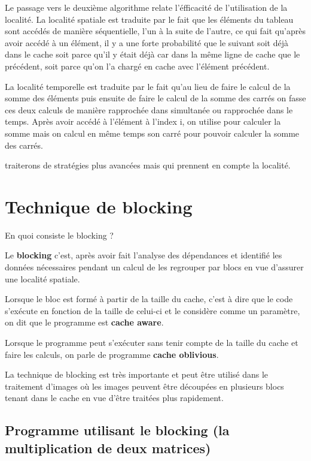 \documentclass[a4paper]{article}
\begin{document}
Le passage vers le deuxième algorithme relate l'éfficacité de l'utilisation de la localité. La localité spatiale est traduite par le fait que les éléments du tableau sont accédés de manière séquentielle, l'un à la suite de l'autre, ce qui fait qu'après avoir accédé à un élément, il y a une forte probabilité que le suivant soit déjà dans le cache soit parce qu'il y était déjà car dans la même ligne de cache que le précédent, soit parce qu'on l'a chargé en cache avec l'élément précédent.

La localité temporelle est traduite par le fait qu'au lieu de faire le calcul de la somme des éléments puis ensuite de faire le calcul de la somme des carrés on fasse ces deux calculs de manière rapprochée dans simultanée ou rapprochée dans le temps. Après avoir accédé à l'élément à l'index i, on utilise pour calculer la somme mais on calcul en même temps son carré pour pouvoir calculer la somme des carrés.


traiterons de stratégies plus avancées mais qui prennent en compte la localité.


\section{Technique de blocking}
\label{sec:org882f9c4}

En quoi consiste le blocking ?

Le \textbf{blocking} c'est, après avoir fait l'analyse des dépendances et identifié les données nécessaires pendant un calcul de les regrouper par blocs en vue d'assurer une localité spatiale.

Lorsque le bloc est formé à partir de la taille du cache, c'est à dire que le code s'exécute en fonction de la taille de celui-ci et le considère comme un paramètre, on dit que le programme est \textbf{cache aware}.

Lorsque le programme peut s'exécuter sans tenir compte de la taille du cache et faire les calculs, on parle de programme \textbf{cache oblivious}.

La technique de blocking est très importante et peut être utilisé dans le traitement d'images où les images peuvent être découpées en plusieurs blocs tenant dans le cache en vue d'être traitées plus rapidement.

\subsection{Programme utilisant le blocking (la multiplication de deux matrices)}
\label{sec:orgb1879ec}
\end{document}
